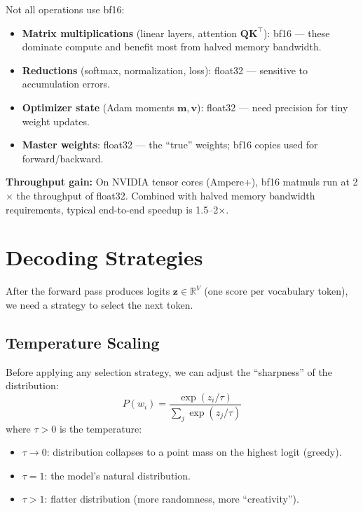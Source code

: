 \documentclass[11pt, a4paper]{article}
\theoremstyle{definition}
\newcommand{\vz}{\bm{z}}
\newcommand{\mQ}{\bm{Q}}
\newcommand{\mK}{\bm{K}}
\newcommand{\reals}{\mathbb{R}}
\begin{document}
Not all operations use bf16:
\begin{itemize}[nosep]
    \item \textbf{Matrix multiplications} (linear layers, attention $\mQ\mK^\top$): bf16 — these dominate compute and benefit most from halved memory bandwidth.
    \item \textbf{Reductions} (softmax, normalization, loss): float32 — sensitive to accumulation errors.
    \item \textbf{Optimizer state} (Adam moments $\bm{m}, \bm{v}$): float32 — need precision for tiny weight updates.
    \item \textbf{Master weights}: float32 — the ``true'' weights; bf16 copies used for forward/backward.
\end{itemize}

\textbf{Throughput gain:} On NVIDIA tensor cores (Ampere+), bf16 matmuls run at 2$\times$ the throughput of float32. Combined with halved memory bandwidth requirements, typical end-to-end speedup is 1.5--2$\times$.

\section{Decoding Strategies}

After the forward pass produces logits $\vz \in \reals^V$ (one score per vocabulary token), we need a strategy to select the next token.

\subsection{Temperature Scaling}

Before applying any selection strategy, we can adjust the ``sharpness'' of the distribution:
\begin{equation}
    P(w_i) = \frac{\exp(z_i / \tau)}{\sum_j \exp(z_j / \tau)}
\end{equation}
where $\tau > 0$ is the temperature:
\begin{itemize}[nosep]
    \item $\tau \to 0$: distribution collapses to a point mass on the highest logit (greedy).
    \item $\tau = 1$: the model's natural distribution.
    \item $\tau > 1$: flatter distribution (more randomness, more ``creativity'').
\end{itemize}
\end{document}
